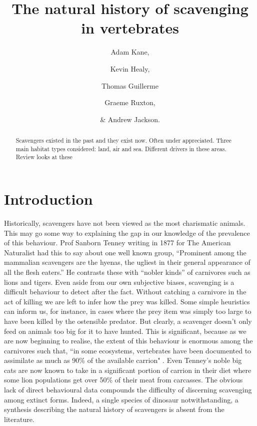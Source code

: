 \documentclass[a4paper,12pt]{article}
\title{The natural history of scavenging in vertebrates}
\author{Adam Kane, \and Kevin Healy, \and Thomas Guillerme \and Graeme Ruxton, \and \& Andrew Jackson.}
\begin{document}
\maketitle


\begin{abstract}
  Scavengers existed in the past and they exist now. 
  Often under appreciated. 
  Three main habitat types considered: land, air and sea. 
  Different drivers in these areas. 
  Review looks at these 
\end{abstract}


\newpage


\section*{Introduction}
Historically, scavengers have not been viewed as the most charismatic animals. This may go some way to explaining the gap in our knowledge of the prevalence of this behaviour. Prof Sanborn Tenney writing in 1877 for The American Naturalist had this to say about one well known group, “Prominent among the mammalian scavengers are the hyenas, the ugliest in their general appearance of all the flesh eaters.” He contrasts these with “nobler kinds” of carnivores such as lions and tigers. Even aside from our own subjective biases, scavenging is a difficult behaviour to detect after the fact. Without catching a carnivore in the act of killing we are left to infer how the prey was killed. Some simple heuristics can inform us, for instance, in cases where the prey item was simply too large to have been killed by the ostensible predator. But clearly, a scavenger doesn’t only feed on animals too big for it to have hunted. 
This is significant, because as we are now beginning to realise, the extent of this behaviour is enormous among the carnivores such that, “in some ecosystems, vertebrates have been documented to assimilate as much as 90\% of the available carrion" \citep{benbow2015introduction}. Even Tenney’s noble big cats are now known to take in a significant portion of carrion in their diet where some lion populations get over 50\% of their meat from carcasses.
The obvious lack of direct behavioural data compounds the difficulty of discerning scavenging among extinct forms. Indeed, a single species of dinosaur notwithstanding, a synthesis describing the natural history of scavengers is absent from the literature. 
\end{document}

